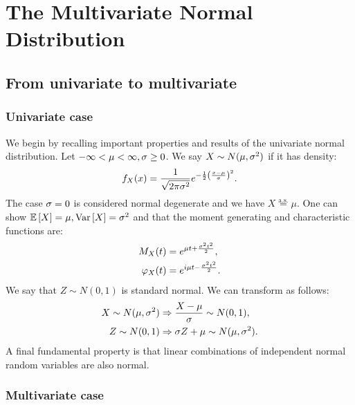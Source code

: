 \section{The Multivariate Normal Distribution}

\subsection{From univariate to multivariate}
\subsubsection{Univariate case}

We begin by recalling important properties and results of the univariate normal distribution. Let $-\infty<\mu<\infty, \sigma\geq 0$. We say $X\sim N(\mu,\sigma^2)$ if it has density:
$$
    f_X(x) = \frac{1}{\sqrt{2\pi \sigma^2}} e^{-\frac{1}{2}\left( \frac{x-\mu}{\sigma} \right)^2}.
$$
The case $\sigma=0$ is considered normal degenerate and we have $X\overset{\mathrm{a.s.}}{=}\mu$. One can show $\mathbb{E}\left[X\right]=\mu, \mathrm{Var}\left[X\right]=\sigma^2$ and that the moment generating and characteristic functions are:
\begin{align*}
    M_X(t) &= e^{\mu t + \frac{\sigma^2 t^2}{2}}, \\
    \varphi_X(t) &= e^{i\mu t - \frac{\sigma^2 t^2}{2}}.
\end{align*}
We say that $Z\sim N(0, 1)$ is standard normal. We can transform as follows:
\begin{align*}
    X \sim N(\mu, \sigma^2) &\Rightarrow \frac{X-\mu}{\sigma} \sim N(0,1), \\
    Z \sim N(0,1) &\Rightarrow \sigma Z + \mu \sim N(\mu, \sigma^2).
\end{align*}
A final fundamental property is that linear combinations of independent normal random variables are also normal. 


\subsubsection{Multivariate case}

